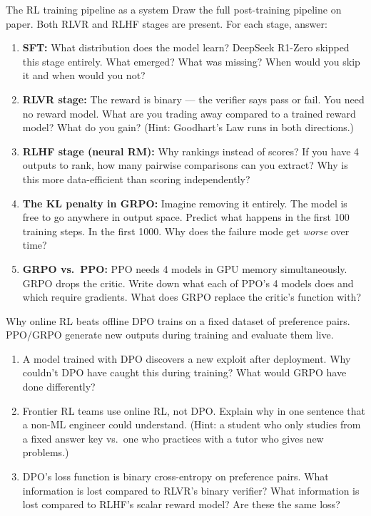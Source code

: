 \begin{thinkfirst}{The RL training pipeline as a system}
Draw the full post-training pipeline on paper. Both RLVR and RLHF stages are present. For each stage, answer:

\begin{enumerate}
  \item \textbf{SFT:} What distribution does the model learn? DeepSeek R1-Zero skipped this stage entirely. What emerged? What was missing? When would you skip it and when would you not?

  \item \textbf{RLVR stage:} The reward is binary --- the verifier says pass or fail. You need no reward model. What are you trading away compared to a trained reward model? What do you gain? (Hint: Goodhart's Law runs in both directions.)

  \item \textbf{RLHF stage (neural RM):} Why rankings instead of scores? If you have 4 outputs to rank, how many pairwise comparisons can you extract? Why is this more data-efficient than scoring independently?

  \item \textbf{The KL penalty in GRPO:} Imagine removing it entirely. The model is free to go anywhere in output space. Predict what happens in the first 100 training steps. In the first 1000. Why does the failure mode get \textit{worse} over time?

  \item \textbf{GRPO vs.\ PPO:} PPO needs 4 models in GPU memory simultaneously. GRPO drops the critic. Write down what each of PPO's 4 models does and which require gradients. What does GRPO replace the critic's function with?
\end{enumerate}
\end{thinkfirst}

\begin{thinkfirst}{Why online RL beats offline}
DPO trains on a fixed dataset of preference pairs. PPO/GRPO generate new outputs during training and evaluate them live.

\begin{enumerate}
  \item A model trained with DPO discovers a new exploit after deployment. Why couldn't DPO have caught this during training? What would GRPO have done differently?

  \item Frontier RL teams use online RL, not DPO. Explain why in one sentence that a non-ML engineer could understand. (Hint: a student who only studies from a fixed answer key vs.\ one who practices with a tutor who gives new problems.)

  \item DPO's loss function is binary cross-entropy on preference pairs. What information is lost compared to RLVR's binary verifier? What information is lost compared to RLHF's scalar reward model? Are these the same loss?
\end{enumerate}
\end{thinkfirst}

